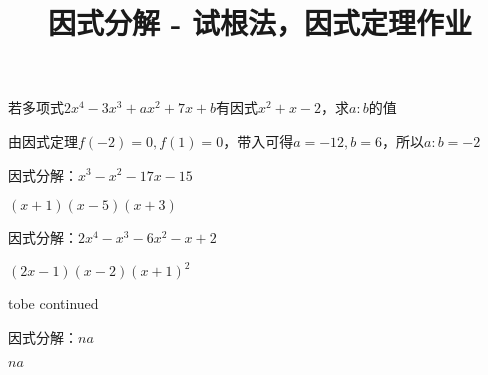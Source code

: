 \documentclass[windows,csize4,answers]{BHCexam}
\title{因式分解 - 试根法，因式定理作业}
\begin{document}
\maketitle


\begin{groups}
    \begin{questions}[]

        \question[5] 若多项式$2x^4-3x^3+ax^2+7x+b$有因式$x^2+x-2$，求$a:b$的值
        \begin{solution}{0.5cm}
            \methodonly 由因式定理$f(-2)=0,f(1)=0$，带入可得$a=-12,b=6$，所以$a:b=-2$
        \end{solution}
        \vspace{3.5cm}

        \question[5] 因式分解：$x^3-x^2-17x-15$
        \begin{solution}{0.5cm}
            \methodonly $(x+1)(x-5)(x+3)$
        \end{solution}
        \vspace{3.5cm}

        \question[5] 因式分解：$2x^4-x^3-6x^2-x+2$
        \begin{solution}{0.5cm}
            \methodonly $(2x-1)(x-2)(x+1)^2$
        \end{solution}
        \vspace{3.5cm}


        tobe continued
        
        \question[5] 因式分解：$na$
        \begin{solution}{0.5cm}
            \methodonly $na$
        \end{solution}
        \vspace{3.5cm}




    \end{questions}

\end{groups}


\label{lastpage}
\end{document}

